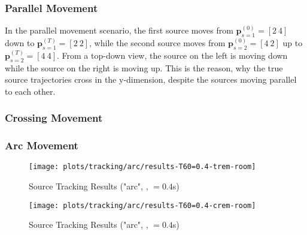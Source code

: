 \subsubsection*{Parallel Movement}
In the parallel movement scenario, the first source moves from $\bm p^{(0)}_{s=1}=[2~4]$ down to $\bm p^{(T)}_{s=1}=[2~2]$, while the second source moves from $\bm p^{(0)}_{s=2}=[4~2]$ up to $\bm p^{(T)}_{s=2}=[4~4]$. From a top-down view, the source on the left is moving down while the source on the right is moving up. This is the reason, why the true source trajectories cross in the y-dimension, despite the sources moving parallel to each other.



\togglefalse{quick}

\toggletrue{quick}
\subsubsection*{Crossing Movement}



\subsubsection*{Arc Movement}



\begin{figure}[H]
	 \centering
    \setlength{\figurewidth}{0.8\textwidth}
    \texttt{[image: plots/tracking/arc/results-T60=0.4-trem-room]}  %
	\caption{Source Tracking Results ("arc", , \Tsixty$=0.4$s)}
\end{figure}

\begin{figure}[H]
	 \centering
    \setlength{\figurewidth}{0.8\textwidth}
    \texttt{[image: plots/tracking/arc/results-T60=0.4-crem-room]}  %
	\caption{Source Tracking Results ("arc", , \Tsixty$=0.4$s)}
\end{figure}




